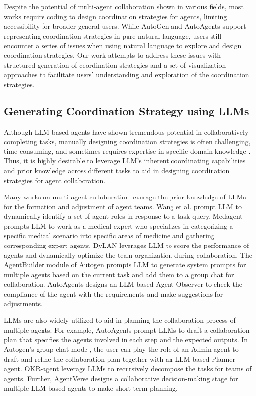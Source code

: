 Despite the potential of multi-agent collaboration shown in various fields, most works require coding to design coordination strategies for agents, limiting accessibility for broader general users. While AutoGen \cite{wu2023autogen} and AutoAgents \cite{AutoAgents} support representing coordination strategies in pure natural language, users still encounter a series of issues when using natural language to explore and design coordination strategies. Our work attempts to address these issues with structured generation of coordination strategies and a set of visualization approaches to facilitate users' understanding and exploration of the coordination strategies.


\subsection{Generating Coordination Strategy using LLMs}
Although LLM-based agents have shown tremendous potential in collaboratively completing tasks, manually designing coordination strategies is often challenging, time-consuming, and sometimes requires expertise in specific domain knowledge \cite{li2023camel}. Thus, it is highly desirable to leverage LLM's inherent coordinating capabilities and prior knowledge across different tasks to aid in designing coordination strategies for agent collaboration.

Many works on multi-agent collaboration leverage the prior knowledge of LLMs for the formation and adjustment of agent teams. Wang et al. \cite{wang2023unleashing} prompt LLM to dynamically identify a set of agent roles in response to a task query. Medagent \cite{tang2023MedAgents} prompts LLM to work as a medical expert who specializes in categorizing a specific medical scenario into specific
areas of medicine and gathering corresponding expert agents. DyLAN \cite{liu2023dynamic} leverages LLM to score the performance of agents and dynamically optimize the team organization during collaboration. The AgentBuilder module of Autogen \cite{wu2023autogen} prompts LLM to generate system prompts for multiple agents based on the current task and add them to a group chat for collaboration. AutoAgents \cite{AutoAgents} designs an LLM-based Agent Observer to check the compliance of the agent with the requirements and make suggestions for adjustments.

LLMs are also widely utilized to aid in planning the collaboration process of multiple agents. For example, AutoAgents \cite{AutoAgents} prompt LLMs to draft a collaboration plan that specifies the agents involved in each step and the expected outputs. In Autogen's group chat mode \cite{wu2023autogen}, the user can play the role of an Admin agent to draft and refine the collaboration plan together with an LLM-based Planner agent. OKR-agent \cite{OKRagents} leverage LLMs to recursively decompose the tasks for teams of agents. Further, AgentVerse \cite{chen2023agentverse} designs a collaborative decision-making stage for multiple LLM-based agents to make short-term planning.

